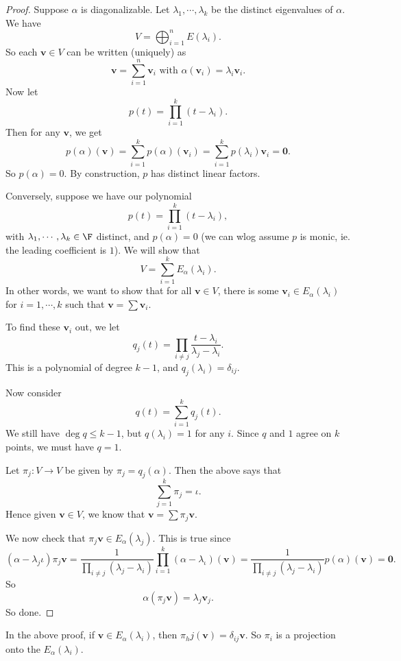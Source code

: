 \documentclass[a4paper]{article}
\begin{document}
\begin{proof}
  Suppose $\alpha$ is diagonalizable. Let $\lambda_1, \cdots, \lambda_k$ be the distinct eigenvalues of $\alpha$. We have
  \[
    V = \bigoplus_{i = 1}^n E(\lambda_i).
  \]
  So each $\mathbf{v} \in V$ can be written (uniquely) as
  \[
    \mathbf{v} = \sum_{i = 1}^n \mathbf{v}_i \text{ with }\alpha(\mathbf{v}_i) = \lambda_i \mathbf{v}_i.
  \]
  Now let
  \[
    p(t) = \prod_{i = 1}^k (t - \lambda_i).
  \]
  Then for any $\mathbf{v}$, we get
  \[
    p(\alpha) (\mathbf{v}) = \sum_{i = 1}^k p(\alpha) (\mathbf{v}_i) = \sum_{i = 1}^k p(\lambda_i) \mathbf{v}_i = \mathbf{0}.
  \]
  So $p(\alpha) = 0$. By construction, $p$ has distinct linear factors.

  Conversely, suppose we have our polynomial
  \[
    p(t) = \prod_{i = 1}^k (t - \lambda_i),
  \]
  with $\lambda_1, \cdots, \lambda_k \in \F$ distinct, and $p(\alpha) = 0$ (we can wlog assume $p$ is monic, ie. the leading coefficient is $1$). We will show that
  \[
    V = \sum_{i = 1}^k E_\alpha(\lambda_i).
  \]
  In other words, we want to show that for all $\mathbf{v} \in V$, there is some $\mathbf{v}_i \in E_\alpha(\lambda_i)$ for $i = 1, \cdots, k$ such that $\mathbf{v} = \sum \mathbf{v}_i$.

  To find these $\mathbf{v}_i$ out, we let
  \[
    q_j(t) = \prod_{i \not= j} \frac{t - \lambda_i}{\lambda_j - \lambda_i}.
  \]
  This is a polynomial of degree $k - 1$, and $q_j(\lambda_i) = \delta_{ij}$.

  Now consider
  \[
    q(t) = \sum_{i = 1}^k q_j(t).
  \]
  We still have $\deg q \leq k - 1$, but $q(\lambda_i) = 1$ for any $i$. Since $q$ and $1$ agree on $k$ points, we must have $q = 1$.

  Let $\pi_j: V\to V$ be given by $\pi_j = q_j(\alpha)$. Then the above says that
  \[
    \sum_{j = 1}^k \pi_j = \iota.
  \]
  Hence given $\mathbf{v} \in V$, we know that $\mathbf{v} = \sum \pi_j \mathbf{v}$.

  We now check that $\pi_j \mathbf{v} \in E_\alpha (\lambda_j)$. This is true since
  \[
    (\alpha - \lambda_j\iota) \pi_j \mathbf{v} =\frac{1}{\prod_{i \not= j}(\lambda_j - \lambda_i)} \prod_{i = 1}^k (\alpha - \lambda_\iota) (\mathbf{v}) = \frac{1}{\prod_{i \not= j}(\lambda_j - \lambda_i)} p(\alpha) (\mathbf{v}) = \mathbf{0}.
  \]
  So
  \[
    \alpha (\pi_j \mathbf{v}) = \lambda_j \mathbf{v}_j.
  \]
  So done.
\end{proof}
In the above proof, if $\mathbf{v} \in E_\alpha(\lambda_i)$, then $\pi_hj(\mathbf{v}) = \delta_{ij}\mathbf{v}$. So $\pi_i$ is a projection onto the $E_\alpha(\lambda_i)$.
\end{document}
